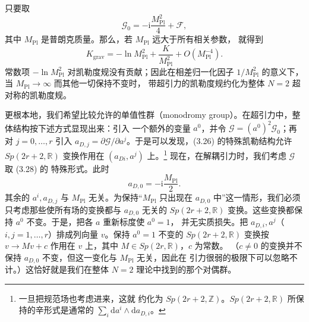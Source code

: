 \documentclass[11pt,a4paper,UTF8,fontset=fandol]{ctexart}
\theoremstyle{plain}
\theoremstyle{definition}
\newcommand{\R}{\mathbb{R}}
\newcommand{\Z}{\mathbb{Z}}
\newcommand{\dd}{\mathrm{d}}
\newcommand{\ii}{\mathrm{i}}
\newcommand{\Nc}{\mathcal{N}}
\newcommand{\Ff}{\mathcal{F}}
\newcommand{\Gg}{\mathcal{G}}
\def\Nc{N}%
\begin{document}
只要取
\begin{equation}
  \Gg_0=-\ii\frac{M_{\mathrm{Pl}}^2}{4}+\Ff, \tag{3.28}
\end{equation}
其中 $M_{\mathrm{Pl}}$ 是普朗克质量。那么，若 $M_{\mathrm{Pl}}$ 远大于所有相关参数，
就得到
\begin{equation}
  K_{\mathrm{grav}}=-\ln M_{\mathrm{Pl}}^2+\frac{K}{M_{\mathrm{Pl}}^2}
  +O(M_{\mathrm{Pl}}^{-4}). \tag{3.29}
\end{equation}
常数项 $-\ln M_{\mathrm{Pl}}^2$ 对凯勒度规没有贡献；因此在相差归一化因子
$1/M_{\mathrm{Pl}}^2$ 的意义下，当 $M_{\mathrm{Pl}}\to\infty$ 而其他一切保持不变时，
带超引力的凯勒度规约化为整体 $\Nc=2$ 超对称的凯勒度规。

更根本地，我们希望比较允许的单值性群（monodromy group）。在超引力中，整体结构按下述方式显现出来：引入
一个额外的变量 $a^0$，并令 $\Gg=(a^0)^2\Gg_0$；再对 $j=0,\dots,r$ 引入
$a_{D,j}=\partial\Gg/\partial a^j$。于是可以发现，(3.26) 的特殊凯勒结构允许
$Sp(2r+2,\R)$ 变换作用在 $(a_{Di},a^j)$ 上。\footnote{一旦把规范场也考虑进来，这就
约化为 $Sp(2r+2,\Z)$。$Sp(2r+2,\R)$ 所保持的辛形式是通常的
$\sum_i \dd a^i\wedge\dd a_{D,i}$。} 现在，在解耦引力时，我们考虑 $\Gg$ 取 (3.28) 的
特殊形式。此时
\begin{equation}
  a_{D,0}=-\ii\frac{M_{\mathrm{Pl}}}{2}. \tag{3.30}
\end{equation}
其余的 $a^i,a_{D,j}$ 与 $M_{\mathrm{Pl}}$ 无关。为保持“$M_{\mathrm{Pl}}$ 只出现在
$a_{D,0}$ 中”这一情形，我们必须只考虑那些使所有场的变换都与 $a_{D,0}$ 无关的
$Sp(2r+2,\R)$ 变换。这些变换都保持 $a^0$ 不变。于是，把各 $a$ 重新标度使 $a^0=1$，
并无实质损失。把 $a_{D,i},a^j$（$i,j=1,\dots,r$）排成列向量 $v$。保持 $a^0=1$ 不变的
$Sp(2r+2,\R)$ 变换按 $v\to Mv+c$ 作用在 $v$ 上，其中 $M\in Sp(2r,\R)$，$c$ 为常数。
（$c\ne0$ 的变换并不保持 $a_{D,0}$ 不变，但这一变化与 $M_{\mathrm{Pl}}$ 无关，因此在
引力很弱的极限下可以忽略不计。）这恰好就是我们在整体 $\Nc=2$ 理论中找到的那个对偶群。
\end{document}

